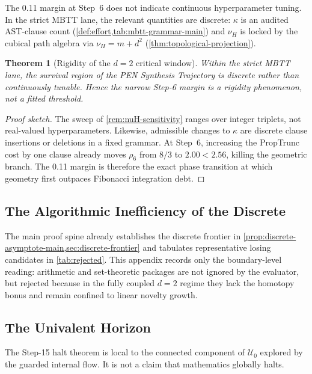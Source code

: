 \documentclass[11pt,a4paper]{article}
\theoremstyle{plain}
\newtheorem{theorem}{Theorem}[section]
\theoremstyle{definition}
\theoremstyle{remark}
\newcommand{\U}{\mathcal{U}}
\begin{document}
The 0.11 margin at Step~6 does not indicate continuous hyperparameter tuning.
In the strict MBTT lane, the relevant quantities are discrete: $\kappa$ is an audited AST-clause count (\cref{def:effort,tab:mbtt-grammar-main}) and $\nu_H$ is locked by the cubical path algebra via $\nu_H = m + d^2$ (\cref{thm:topological-projection}).

\begin{theorem}[Rigidity of the $d=2$ critical window]
\label{thm:rigidity}
Within the strict MBTT lane, the survival region of the PEN Synthesis Trajectory is discrete rather than continuously tunable.
Hence the narrow Step-6 margin is a rigidity phenomenon, not a fitted threshold.
\end{theorem}

\begin{proof}[Proof sketch]
The sweep of \cref{rem:nuH-sensitivity} ranges over integer triplets, not real-valued hyperparameters.
Likewise, admissible changes to $\kappa$ are discrete clause insertions or deletions in a fixed grammar.
At Step~6, increasing the PropTrunc cost by one clause already moves $\rho_6$ from $8/3$ to $2.00 < 2.56$, killing the geometric branch.
The 0.11 margin is therefore the exact phase transition at which geometry first outpaces Fibonacci integration debt.
\end{proof}

\subsection{The Algorithmic Inefficiency of the Discrete}
\label{sec:discrete}

The main proof spine already establishes the discrete frontier in \cref{prop:discrete-asymptote-main,sec:discrete-frontier} and tabulates representative losing candidates in \cref{tab:rejected}.
This appendix records only the boundary-level reading: arithmetic and set-theoretic packages are not ignored by the evaluator, but rejected because in the fully coupled $d=2$ regime they lack the homotopy bonus and remain confined to linear novelty growth.

\subsection{The Univalent Horizon}
\label{sec:godelian}

The Step-15 halt theorem is local to the connected component of $\U_0$ explored by the guarded internal flow.
It is not a claim that mathematics globally halts.
\end{document}

